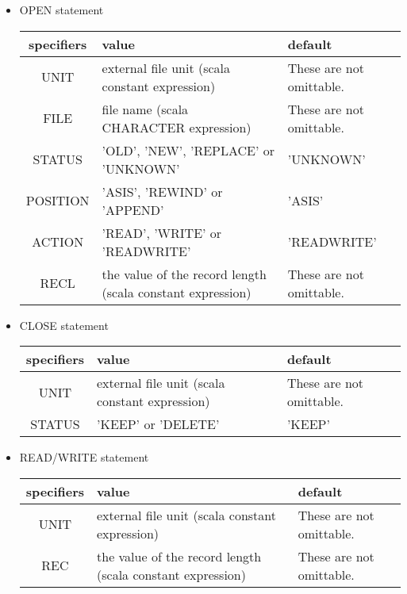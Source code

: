    \begin{itemize}
    \item OPEN statement
   
   \begin{table}[h]
    \begin{center}
     \label{tb:globalopen}
     \begin{tabular}{c|p{70mm}l}
      specifiers & value & default \\ \hline
      UNIT & external file unit (scala constant expression)
	  & These are not omittable. \\
      FILE & file name (scala CHARACTER expression)
	  & These are not omittable. \\
      STATUS & 'OLD', 'NEW', 'REPLACE' or 'UNKNOWN' & 'UNKNOWN' \\
      POSITION & 'ASIS', 'REWIND' or 'APPEND' & 'ASIS' \\
      ACTION & 'READ', 'WRITE' or 'READWRITE' & 'READWRITE' \\
      RECL & the value of the record length (scala constant expression)
	  & These are not omittable. \\
     \end{tabular}
    \end{center}
   \end{table}

    \item CLOSE statement
	  
   \begin{table}[h]
    \begin{center}
     \label{tb:globalopen}
     \begin{tabular}{c|p{70mm}l}
      specifiers & value & default \\ \hline
      UNIT & external file unit (scala constant expression)
	  & These are not omittable. \\
      STATUS & 'KEEP' or 'DELETE'
	  & 'KEEP' \\
     \end{tabular}
    \end{center}
   \end{table}

    \item READ/WRITE statement
	  
   \begin{table}[h]
    \begin{center}
     \label{tb:globalopen}
     \begin{tabular}{c|p{70mm}l}
      specifiers & value & default \\ \hline
      UNIT & external file unit (scala constant expression)
	  & These are not omittable. \\
      REC & the value of the record length (scala constant expression)
	  & These are not omittable. \\
     \end{tabular}
    \end{center}
   \end{table}


\end{itemize}
